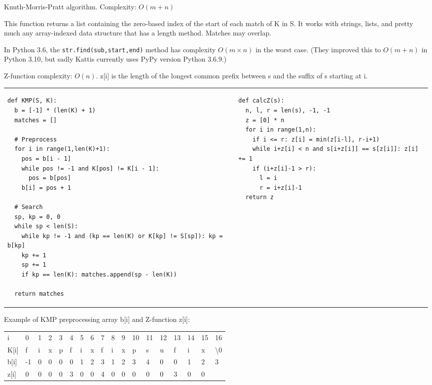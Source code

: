 \documentclass[letterpaper]{article}
\begin{document}
Knuth-Morris-Pratt algorithm. Complexity: $O\left(m+n\right)$

This function returns a list containing the zero-based index of the start of
each match of K in S. It works with strings, lists, and pretty much any
array-indexed data structure that has a length method. Matches may overlap.

In Python 3.6, the \texttt{str.find(sub,start,end)} method has complexity $O(m
    \times n)$ in the worst case. (They improved this to $O(m+n)$ in Python 3.10,
but sadly Kattis currently uses PyPy version Python 3.6.9.)

Z-function complexity: $O\left(n\right)$. z[i] is the length of the longest common prefix between s and the suffix of s starting at i.
\begin{tabular}{@{}p{9cm}p{9cm}@{}}
    \begin{lstlisting}
def KMP(S, K):
  b = [-1] * (len(K) + 1)
  matches = []

  # Preprocess
  for i in range(1,len(K)+1):
    pos = b[i - 1]
    while pos != -1 and K[pos] != K[i - 1]:
      pos = b[pos]
    b[i] = pos + 1

  # Search
  sp, kp = 0, 0
  while sp < len(S):
    while kp != -1 and (kp == len(K) or K[kp] != S[sp]): kp = b[kp]
    kp += 1
    sp += 1
    if kp == len(K): matches.append(sp - len(K))

  return matches
\end{lstlisting}
     &
    \begin{lstlisting}
def calcZ(s):
  n, l, r = len(s), -1, -1
  z = [0] * n
  for i in range(1,n):
    if i <= r: z[i] = min(z[i-l], r-i+1)
    while i+z[i] < n and s[i+z[i]] == s[z[i]]: z[i] += 1
    if (i+z[i]-1 > r):
      l = i
      r = i+z[i]-1
  return z
\end{lstlisting}
\end{tabular}

Example of KMP preprocessing array b[i] and Z-function z[i]:

{
\fontfamily{\ttdefault}\selectfont
\begin{tabular}{llllllllllllllllll}
    i    & 0  & 1 & 2 & 3 & 4 & 5 & 6 & 7 & 8 & 9 & 10 & 11 & 12 & 13 & 14 & 15 & 16               \\
    K[i] & f  & i & x & p & f & i & x & f & i & x & p  & s  & u  & f  & i  & x  & \textbackslash 0 \\
    b[i] & -1 & 0 & 0 & 0 & 0 & 1 & 2 & 3 & 1 & 2 & 3  & 4  & 0  & 0  & 1  & 2  & 3                \\
    z[i] & 0  & 0 & 0 & 0 & 3 & 0 & 0 & 4 & 0 & 0 & 0  & 0  & 0  & 3  & 0  & 0  &
\end{tabular}
}
\end{document}
